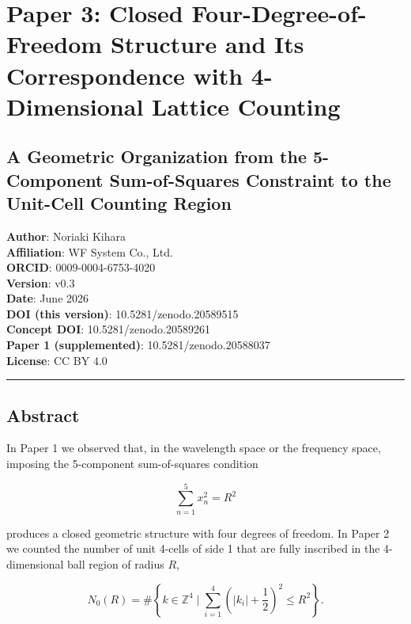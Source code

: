 \documentclass[
]{article}
\author{}
\date{}
\begin{document}
\section{Paper 3: Closed Four-Degree-of-Freedom Structure and Its
Correspondence with 4-Dimensional Lattice
Counting}\label{paper-3-closed-four-degree-of-freedom-structure-and-its-correspondence-with-4-dimensional-lattice-counting}

\subsection{A Geometric Organization from the 5-Component Sum-of-Squares
Constraint to the Unit-Cell Counting
Region}\label{a-geometric-organization-from-the-5-component-sum-of-squares-constraint-to-the-unit-cell-counting-region}

\textbf{Author}: Noriaki Kihara\\
\textbf{Affiliation}: WF System Co., Ltd.\\
\textbf{ORCID}: 0009-0004-6753-4020\\
\textbf{Version}: v0.3\\
\textbf{Date}: June 2026\\
\textbf{DOI (this version)}: 10.5281/zenodo.20589515\\
\textbf{Concept DOI}: 10.5281/zenodo.20589261\\
\textbf{Paper 1 (supplemented)}: 10.5281/zenodo.20588037\\
\textbf{License}: CC BY 4.0

\begin{center}\rule{0.5\linewidth}{0.5pt}\end{center}

\subsection{Abstract}\label{abstract}

In Paper 1 we observed that, in the wavelength space or the frequency
space, imposing the 5-component sum-of-squares condition

\[
\sum_{n=1}^{5}x_n^2=R^2
\]

produces a closed geometric structure with four degrees of freedom. In
Paper 2 we counted the number of unit 4-cells of side 1 that are fully
inscribed in the 4-dimensional ball region of radius \(R\),

\[
N_0(R)
=
\#\left\{
k\in\mathbb{Z}^4
\mid
\sum_{i=1}^{4}
\left(|k_i|+\frac12\right)^2
\le R^2
\right\} .
\]
\end{document}
